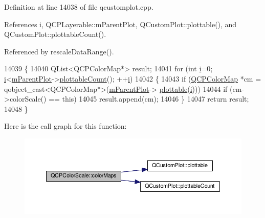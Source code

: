 Definition at line 14038 of file qcustomplot.\+cpp.



References i, Q\+C\+P\+Layerable\+::m\+Parent\+Plot, Q\+Custom\+Plot\+::plottable(), and Q\+Custom\+Plot\+::plottable\+Count().



Referenced by rescale\+Data\+Range().


\begin{DoxyCode}
14039 \{
14040   QList<QCPColorMap*> result;
14041   \textcolor{keywordflow}{for} (\textcolor{keywordtype}{int} \hyperlink{_comparision_pictures_2_createtest_image_8m_a6f6ccfcf58b31cb6412107d9d5281426}{i}=0; \hyperlink{_comparision_pictures_2_createtest_image_8m_a6f6ccfcf58b31cb6412107d9d5281426}{i}<\hyperlink{class_q_c_p_layerable_aa2a528433e44db02b8aef23c1f9f90ed}{mParentPlot}->\hyperlink{class_q_custom_plot_a2dbfbf15dc38713f9a1c445a3dd2e989}{plottableCount}(); ++\hyperlink{_comparision_pictures_2_createtest_image_8m_a6f6ccfcf58b31cb6412107d9d5281426}{i})
14042   \{
14043     \textcolor{keywordflow}{if} (\hyperlink{class_q_c_p_color_map}{QCPColorMap} *cm = qobject\_cast<QCPColorMap*>(\hyperlink{class_q_c_p_layerable_aa2a528433e44db02b8aef23c1f9f90ed}{mParentPlot}->
      \hyperlink{class_q_custom_plot_a32de81ff53e263e785b83b52ecd99d6f}{plottable}(\hyperlink{_comparision_pictures_2_createtest_image_8m_a6f6ccfcf58b31cb6412107d9d5281426}{i})))
14044       \textcolor{keywordflow}{if} (cm->colorScale() == \textcolor{keyword}{this})
14045         result.append(cm);
14046   \}
14047   \textcolor{keywordflow}{return} result;
14048 \}
\end{DoxyCode}


Here is the call graph for this function\+:\nopagebreak
\begin{figure}[H]
\begin{center}
\leavevmode
\includegraphics[width=350pt]{class_q_c_p_color_scale_a01bb96981614f2556ef7da04531a7a05_cgraph}
\end{center}
\end{figure}




